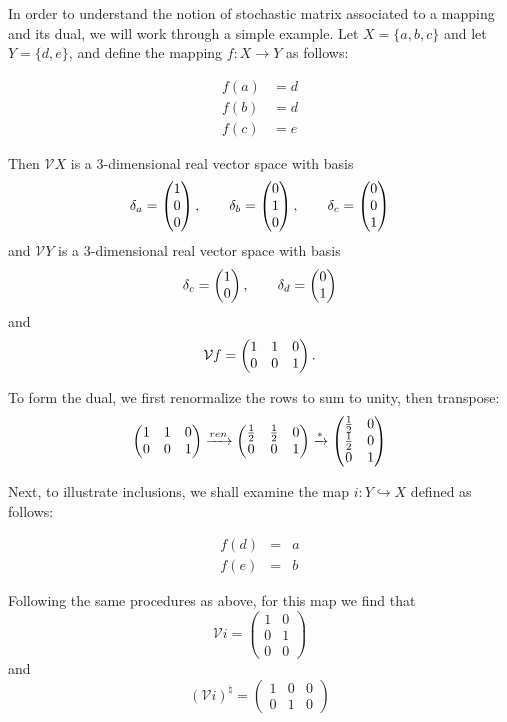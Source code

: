 \documentclass[12pt]{article}
\newcommand{\vecify}{{\mathcal V}}
\begin{document}
In order to understand the notion of stochastic matrix associated
to a mapping and its dual, we will work through a simple example.
Let $X = \{a,b,c\}$ and let $Y = \{d,e\}$, and define the mapping
$f \colon X \to Y$ as follows:

\begin{align*}
 f(a) &= d \\
 f(b) &= d \\
 f(c) &= e
\end{align*}

Then $\vecify X$ is a 3-dimensional real vector space with basis
\[
 \delta_a = \begin{pmatrix} 1 \cr 0 \cr 0 \end{pmatrix}, \qquad
 \delta_b = \begin{pmatrix} 0 \cr 1 \cr 0 \end{pmatrix}, \qquad
 \delta_c = \begin{pmatrix} 0 \cr 0 \cr 1 \end{pmatrix}
\]
and $\vecify Y$ is a 3-dimensional real vector space with basis
\[
 \delta_c = \begin{pmatrix} 1 \cr 0 \end{pmatrix}, \qquad
 \delta_d = \begin{pmatrix} 0 \cr 1 \end{pmatrix}
\]
and
\[
 {\vecify f} = \begin{pmatrix} 1 & 1 & 0 \cr 0 & 0 & 1 \end{pmatrix} .
\]

To form the dual, we first renormalize the rows to sum to unity, 
then transpose:
\[
 \begin{pmatrix} 1 & 1 & 0 \cr 
                 0 & 0 & 1 \end{pmatrix} \xrightarrow{ren}
 \begin{pmatrix} \frac{1}{2} & \frac{1}{2} & 0 \cr 
                 0 & 0 & 1 \end{pmatrix} \xrightarrow{*}
 \begin{pmatrix} \frac{1}{2} & 0 \cr
                 \frac{1}{2} & 0 \cr
                 0 & 1 \end{pmatrix}
\]

Next, to illustrate inclusions, we shall examine the map $i \colon Y 
\hookrightarrow X$ defined as follows:

\begin{align*}
 f(d) &=& a \\
 f(e) &=& b
\end{align*}

Following the same procedures as above, for this map we find that
\[
 {\vecify i} = \begin{pmatrix} 1 & 0 \\ 0 & 1 \\ 0 & 0 \end{pmatrix}
\]
and
\[
  ({\vecify i})^\natural = 
   \begin{pmatrix} 1 & 0 & 0 \\ 0 & 1 & 0 \end{pmatrix}
\]
\end{document}
